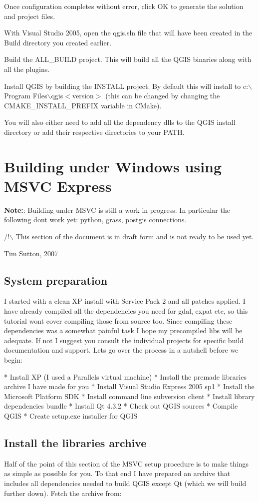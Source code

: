 Once configuration completes without error, click OK to generate the solution and project files.

With Visual Studio 2005, open the qgis.sln file that will have been created in the Build directory you created earlier.

Build the ALL\_BUILD project. This will build all the QGIS binaries along with all the plugins.

 Install QGIS by building the INSTALL project. By default this will install to c:$\backslash$Program Files$\backslash$qgis$<$version$>$ (this can be changed by changing the CMAKE\_INSTALL\_PREFIX variable in CMake). 

 You will also either need to add all the dependency dlls to the QGIS install directory or add their respective directories to your PATH.

\section{Building under Windows using MSVC Express}
\textbf{Note:}: Building under MSVC is still a work in progress. In particular the following dont work yet: python, grass, postgis connections.

/!$\backslash$ This section of the document is in draft form and is not ready to be used yet.

Tim Sutton, 2007

\subsection{System preparation}
I started with a clean XP install with Service Pack 2 and all patches applied.
I have already compiled all the dependencies you need for gdal, expat etc,
so this tutorial wont cover compiling those from source too. Since compiling 
these dependencies was a somewhat painful task I hope my precompiled libs 
will be adequate. If not I suggest you consult the individual projects for
specific build documentation and support. Lets go over the process in a nutshell 
before we begin:

 * Install XP (I used a Parallels virtual machine)
 * Install the premade libraries archive I have made for you
 * Install Visual Studio Express 2005 sp1
 * Install the Microsoft Platform SDK
 * Install command line subversion client
 * Install library dependencies bundle
 * Install Qt 4.3.2
 * Check out QGIS sources
 * Compile QGIS
 * Create setup.exe installer for QGIS

\subsection{Install the libraries archive}
Half of the point of this section of the MSVC setup procedure is to make 
things as simple as possible for you. To that end I have prepared an
archive that includes all dependencies needed to build QGIS except Qt 
(which we will build further down). Fetch the archive from:

